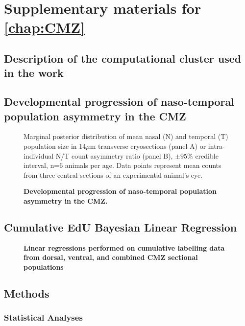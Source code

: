 \chapter{Supplementary materials for \autoref{chap:CMZ}}
\section{Description of the computational cluster used in the work}
\label{cluster}

\section{Developmental progression of naso-temporal population asymmetry in the CMZ}

\begin{figure}[!h]
    \caption{{\bf Developmental progression of naso-temporal population asymmetry in the CMZ.}}
    Marginal posterior distribution of mean nasal (N) and temporal (T) population size in 14$\mu$m transverse cryosections (panel A) or intra-individual N/T count asymmetry ratio (panel B), $\pm 95\%$ credible interval, n=6 animals per age. Data points represent mean counts from three central sections of an experimental animal's eye. 
    \label{NTontology}
\end{figure}


\section{Cumulative EdU Bayesian Linear Regression}


\begin{figure}[!h]
    \caption{{\bf Linear regressions performed on cumulative labelling data from dorsal, ventral, and combined CMZ sectional populations}}
    \label{cumEdUlinreg}
\end{figure}

\section{Methods}
\label{ssec:CMZmethods}

\subsection{Statistical Analyses}



